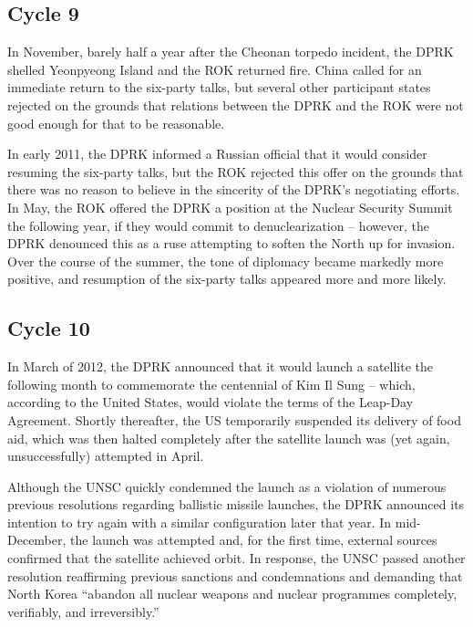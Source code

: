 \documentclass{article}
\begin{document}
\subsection{Cycle 9}

In November, barely half a year after the Cheonan torpedo incident, the DPRK shelled Yeonpyeong Island and the ROK returned fire\cite{bbc}. China called for an immediate return to the six-party talks\cite{bbc}, but several other participant states rejected on the grounds that relations between the DPRK and the ROK were not good enough for that to be reasonable\cite{davenport}.

In early 2011, the DPRK informed a Russian official that it would consider resuming the six-party talks, but the ROK rejected this offer on the grounds that there was no reason to believe in the sincerity of the DPRK’s negotiating efforts\cite{davenport}. In May, the ROK offered the DPRK a position at the Nuclear Security Summit the following year, if they would commit to denuclearization – however, the DPRK denounced this as a ruse attempting to soften the North up for invasion\cite{davenport}. Over the course of the summer, the tone of diplomacy became markedly more positive, and resumption of the six-party talks appeared more and more likely\cite{davenport}.

\subsection{Cycle 10}

In March of 2012, the DPRK announced that it would launch a satellite the following month to commemorate the centennial of Kim Il Sung – which, according to the United States, would violate the terms of the Leap-Day Agreement\cite{davenport}. Shortly thereafter, the US temporarily suspended its delivery of food aid, which was then halted completely after the satellite launch was (yet again, unsuccessfully) attempted in April\cite{davenport}.

Although the UNSC quickly condemned the launch as a violation of numerous previous resolutions regarding ballistic missile launches\cite{unsc12}, the DPRK announced its intention to try again with a similar configuration later that year. In mid-December, the launch was attempted and, for the first time, external sources confirmed that the satellite achieved orbit\cite{davenport}. In response, the UNSC passed another resolution reaffirming previous sanctions and condemnations and demanding that North Korea “abandon all nuclear weapons and nuclear programmes completely, verifiably, and irreversibly.” \cite{unsc13}
\end{document}

